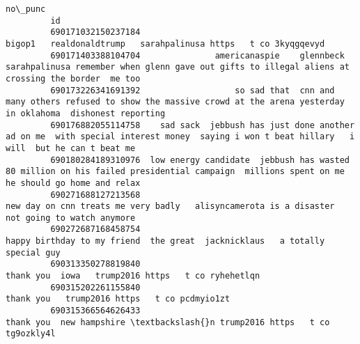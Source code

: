 \documentclass[11pt]{article}
\begin{document}
\begin{Verbatim}[commandchars=\\\{\}]
                                                                                                                                                                  no\_punc  
         id                                                                                                                                                                
         690171032150237184                                                                             bigop1   realdonaldtrump   sarahpalinusa https   t co 3kyqgqevyd   
         690171403388104704               americanaspie    glennbeck  sarahpalinusa remember when glenn gave out gifts to illegal aliens at crossing the border  me too    
         690173226341691392                   so sad that  cnn and many others refused to show the massive crowd at the arena yesterday in oklahoma  dishonest reporting   
         690176882055114758    sad sack  jebbush has just done another ad on me  with special interest money  saying i won t beat hillary   i will  but he can t beat me   
         690180284189310976  low energy candidate  jebbush has wasted  80 million on his failed presidential campaign  millions spent on me  he should go home and relax   
         690271688127213568                                               new day on cnn treats me very badly   alisyncamerota is a disaster  not going to watch anymore   
         690272687168458754                                                                 happy birthday to my friend  the great  jacknicklaus   a totally special guy   
         690313350278819840                                                                                           thank you  iowa   trump2016 https   t co ryhehetlqn  
         690315202261155840                                                                                                 thank you   trump2016 https   t co pcdmyio1zt  
         690315366564626433                                                                                 thank you  new hampshire \textbackslash{}n trump2016 https   t co tg9ozkly4l  
\end{Verbatim}
            
\end{document}
